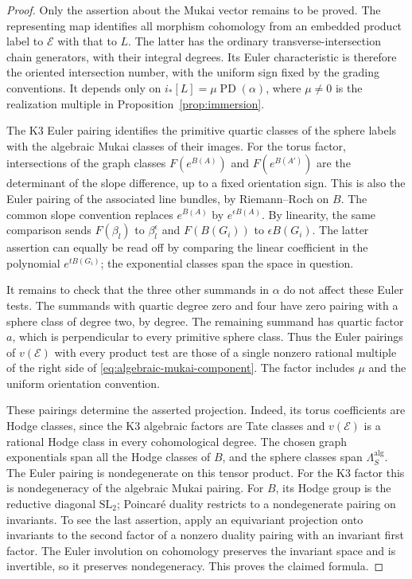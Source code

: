 \documentclass[11pt]{article}
\numberwithin{equation}{section}
\theoremstyle{definition}
\theoremstyle{remark}
\newcommand{\PD}{\operatorname{PD}}
\begin{document}
\begin{proof}
Only the assertion about the Mukai vector remains to be proved.
The representing map identifies all morphism cohomology from an
embedded product label to $\mathcal E$ with that to $L$.
The latter has the ordinary transverse-intersection chain generators,
with their integral degrees.  Its Euler characteristic is therefore
the oriented intersection number, with the uniform sign fixed by
the grading conventions.  It depends only on
$i_*[L]=\mu\PD(\alpha)$, where $\mu\ne0$ is the realization
multiple in Proposition~\ref{prop:immersion}.

The K3 Euler pairing identifies the primitive quartic classes of the
sphere labels with the algebraic Mukai classes of their images.
For the torus factor, intersections of the graph classes
$F(e^{B(A)})$ and $F(e^{B(A')})$ are the determinant of the slope
difference, up to a fixed orientation sign.  This is also the Euler
pairing of the associated line bundles, by Riemann--Roch on $B$.
The common slope convention replaces $e^{B(A)}$ by
$e^{\epsilon B(A)}$.  By linearity, the same comparison sends
$F(\beta_l)$ to $\beta_l^\epsilon$ and $F(B(G_i))$ to
$\epsilon B(G_i)$.  The latter assertion can equally be read off by
comparing the linear coefficient in the polynomial
$e^{tB(G_i)}$; the exponential classes span the space in question.

It remains to check that the three other summands in $\alpha$ do not
affect these Euler tests.  The summands with quartic degree zero and
four have zero pairing with a sphere class of degree two, by degree.
The remaining summand has quartic factor $a$, which is perpendicular
to every primitive sphere class.  Thus the Euler pairings of
$v(\mathcal E)$ with every product test are those of a single nonzero
rational multiple of the right side of
\eqref{eq:algebraic-mukai-component}.  The factor includes $\mu$ and
the uniform orientation convention.

These pairings determine the asserted projection.  Indeed, its torus
coefficients are Hodge classes, since the K3 algebraic factors are
Tate classes and $v(\mathcal E)$ is a rational Hodge class in every
cohomological degree.  The chosen graph exponentials span all the
Hodge classes of $B$, and the sphere classes span
$\Lambda_S^{\mathrm{alg}}$.  The Euler pairing is nondegenerate on
this tensor product.  For the K3 factor this is nondegeneracy of the
algebraic Mukai pairing.  For $B$, its Hodge group is the reductive
diagonal $\mathrm{SL}_2$; Poincar\'e duality restricts to a
nondegenerate pairing on invariants.  To see the last assertion,
apply an equivariant projection onto invariants to the second factor
of a nonzero duality pairing with an invariant first factor.
The Euler involution on cohomology preserves the invariant space
and is invertible, so it preserves nondegeneracy.
This proves the claimed formula.
\end{proof}
\end{document}
